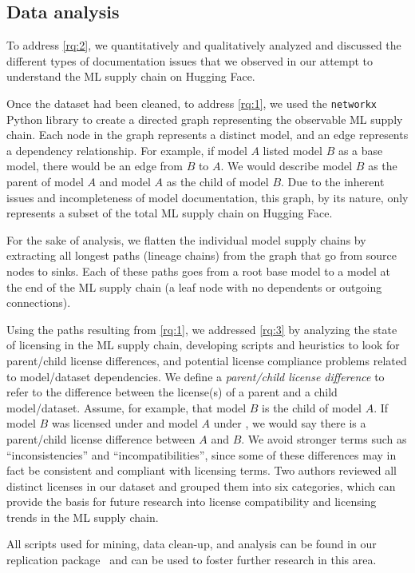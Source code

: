 \subsection{Data analysis}


To address \ref{rq:2}, we quantitatively and qualitatively analyzed and discussed the different types of documentation issues that we observed in our attempt to understand the ML supply chain on Hugging Face.

Once the dataset had been cleaned, to address \ref{rq:1}, we used the \texttt{networkx} Python library \cite{networkx} to create a directed %
graph representing the observable  %
ML supply chain.  Each node in the graph represents a distinct model, and an edge represents a dependency relationship. For example, if model $A$ listed model $B$ as a base model, there would be an edge from $B$ to $A$. We would describe model $B$ as the parent of model $A$ and model $A$ as the child of model $B$. %
Due to the inherent issues and incompleteness of model documentation, this graph, by its nature, only represents a subset of the total ML supply chain on Hugging Face.%


For the sake of analysis, we flatten the individual model supply chains by extracting all longest paths (\eg lineage chains) %
from the graph that go from source nodes to sinks.  Each of these paths goes %
from a root base model to a model at the end of the ML supply chain (\ie a leaf node with no dependents or outgoing connections).

Using the paths resulting from \ref{rq:1}, we addressed \ref{rq:3} by analyzing the state of licensing in the ML supply chain, developing scripts and heuristics to look for parent/child license differences, %
and potential license compliance problems related to model/dataset dependencies.  %
We define a \textit{parent/child license difference} to refer to the difference between the license(s) of a parent and a child model/dataset. Assume, for example, that model $B$ is the child of model $A$. If model $B$ was licensed under  and model $A$ under , we would say there is a parent/child license difference between $A$ and $B$. We avoid stronger terms such as ``inconsistencies'' and ``incompatibilities'', since some of these differences may in fact be consistent and compliant with licensing terms. %
Two authors reviewed all distinct licenses in our dataset and grouped them into six categories, which can provide the basis for future research into license compatibility and licensing trends in the ML supply chain. 

All scripts used for mining, data clean-up, and analysis can be found in our replication package~\cite{anonymous_repo} and can be used to foster further research in this area.

